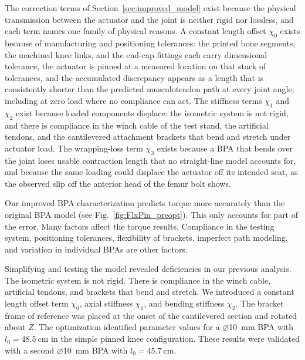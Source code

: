 The correction terms of Section~\ref{sec:improved_model} exist because the physical transmission between the actuator and the joint is neither rigid nor lossless, and each term names one family of physical reasons. A constant length offset $\chi_{0}$ exists because of manufacturing and positioning tolerances: the printed bone segments, the machined knee links, and the end-cap fittings each carry dimensional tolerance, the actuator is pinned at a measured location on that stack of tolerances, and the accumulated discrepancy appears as a length that is consistently shorter than the predicted musculotendon path at every joint angle, including at zero load where no compliance can act. The stiffness terms $\chi_{1}$ and $\chi_{2}$ exist because loaded components displace: the isometric system is not rigid, and there is compliance in the winch cable of the test stand, the artificial tendons, and the cantilevered attachment brackets that bend and stretch under actuator load. The wrapping-loss term $\chi_{3}$ exists because a BPA that bends over the joint loses usable contraction length that no straight-line model accounts for, and because the same loading could displace the actuator off its intended seat, as the observed slip off the anterior head of the femur bolt shows.

Our improved BPA characterization predicts torque more accurately than the original BPA model (see Fig.~\ref{fig:FlxPin_preopt}). This only accounts for part of the error. Many factors affect the torque results. Compliance in the testing system, positioning tolerances, flexibility of brackets, imperfect path modeling, and variation in individual BPAs are other factors.

Simplifying and testing the model revealed deficiencies in our previous analysis. The isometric system is not rigid. There is compliance in the winch cable, artificial tendons, and brackets that bend and stretch. We introduced a constant length offset term $\chi_{0}$, axial stiffness $\chi_{1}$, and bending stiffness $\chi_{2}$. The bracket frame of reference was placed at the onset of the cantilevered section and rotated about $Z$.  The optimization identified parameter values for a $\diameter$\qty{10}{\mm} BPA with $l_{0}=\qty{48.5}{\cm}$ in the simple pinned knee configuration. These results were validated with a second $\diameter$\qty{10}{\mm} BPA with $l_{0}=\qty{45.7}{\cm}$.

